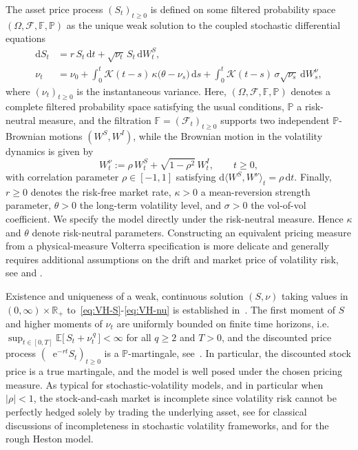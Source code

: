 \documentclass[10pt,a4paper,reqno]{amsart}
\newcommand*{\E}{\mathop{} \mathrm{e}}
\theoremstyle{plain}
\theoremstyle{definition}
\theoremstyle{remark}
\theoremstyle{example}
\begin{document}
The asset price process $(S_{t})_{t\geq 0}$ is defined on some filtered probability space $(\Omega,\mathcal{F},\mathbb{F},\mathbb{P})$ as the unique weak solution to the coupled stochastic differential equations
\begin{align}
  \mathrm{d}S_t &= r\,S_t\,\mathrm{d}t 
    + \sqrt{\nu_t}\,S_t\,\mathrm{d}W^S_t, 
    \label{eq:VH-S} \\
  \nu_t &= \nu_0 
    + \int_0^t \mathcal{K}(t-s)\,
        \kappa\bigl(\theta - \nu_s\bigr)\,\mathrm{d}s
    + \int_0^t \mathcal{K}(t-s)\,
        \sigma\sqrt{\nu_s}\,\mathrm{d}W^\nu_s,
    \label{eq:VH-nu}
\end{align}
where $(\nu_t)_{t\geq 0}$ is the instantaneous variance. Here, $(\Omega,\mathcal{F},\mathbb{F},\mathbb{P})$ denotes a complete filtered probability space satisfying the usual conditions, $\mathbb{P}$ a risk-neutral measure, and the filtration $\mathbb{F}=(\mathcal{F}_t)_{t\ge 0}$ supports two independent $\mathbb{P}$-Brownian motions $(W^{S},W^{I})$, while the Brownian motion in the volatility dynamics is given by 
\[
  W^{\nu}_t := \rho\,W^{S}_t + \sqrt{1-\rho^{2}}\,W^{I}_t, \qquad t\ge 0,
\]
with correlation parameter $\rho \in [-1,1]$ satisfying $\mathrm{d}\langle W^S, W^\nu\rangle_t = \rho\,\mathrm{d}t$. Finally, $r \geq 0$ denotes the risk-free market rate, $\kappa > 0$ a mean-reversion strength parameter, $\theta > 0$ the long-term volatility level, and $\sigma > 0$ the vol-of-vol coefficient. We specify the model directly under the risk-neutral measure. Hence $\kappa$ and $\theta$ denote risk-neutral parameters. Constructing an equivalent pricing measure from a physical-measure Volterra specification is more delicate and generally requires additional assumptions on the drift and market price of volatility risk, see \cite{FGW26} and \cite{BJ26}.

Existence and uniqueness of a weak, continuous solution $(S,\nu)$ taking values in $(0,\infty) \times \mathbb{R}_+$ to~\eqref{eq:VH-S}-\eqref{eq:VH-nu} is established in~\cite[Thm.~7.1(i)]{abi2019affine}. The first moment of $S$ and higher moments of $\nu_t$ are uniformly bounded on finite time horizons, i.e. $\sup_{t\in[0,T]} \mathbb{E}\bigl[\, S_t + \nu_t^{\,q}\,\bigr] < \infty$ for all $q\ge 2$ and $T>0$, and the discounted price process $(\E^{-rt}S_t)_{t\geq 0}$ is a $\mathbb{P}$-martingale, see~\cite[Lem. 3.1 and Lem.~7.3]{abi2019affine}. In particular, the discounted stock price is a true martingale, and the model is well posed under the chosen pricing measure. As typical for stochastic-volatility models, and in particular when $|\rho|<1$, the stock-and-cash market is incomplete since volatility risk cannot be perfectly hedged solely by trading the underlying asset, see \cite{steinstein1991} for classical discussions of incompleteness in stochastic volatility frameworks, and \cite{euch2018perfect} for the rough Heston model.
\end{document}
